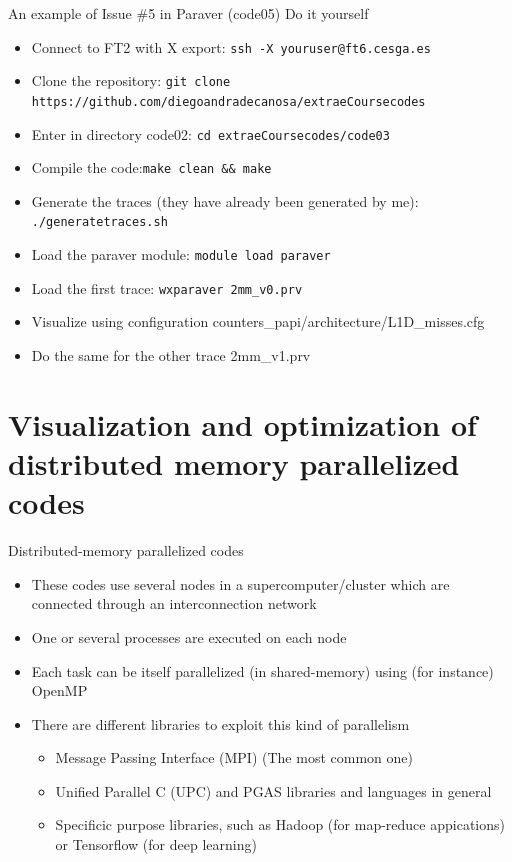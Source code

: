 \documentclass[10pt,xcolor=table]{beamer}
\begin{document}
\begin{frame}{An example of Issue \#5 in Paraver (code05)}
Do it yourself
\begin{itemize}
    \item Connect to FT2 with X export: {\tt ssh -X youruser@ft6.cesga.es}
    \item Clone the repository: {\tt git clone https://github.com/diegoandradecanosa/extraeCoursecodes}
    \item Enter in directory code02: {\tt cd extraeCoursecodes/code03}
        \item Compile the code:{\tt make clean \&\& make}
    \item Generate the traces (they have already been generated by me): {\tt ./generatetraces.sh}
    \item Load the paraver module:  {\tt module load paraver}
    \item Load the first trace: {\tt wxparaver 2mm\_v0.prv}
    \item Visualize using configuration counters\_papi/architecture/L1D\_misses.cfg
    \item Do the same for the other trace 2mm\_v1.prv
\end{itemize}
\end{frame}




\section{Visualization and optimization of distributed memory parallelized codes}


\begin{frame}{Distributed-memory parallelized codes}
\begin{itemize}
    \item These codes use several nodes in a supercomputer/cluster which are connected through an interconnection network
    \item One or several processes are executed on each node
    \item Each task can be itself parallelized (in shared-memory) using (for instance) OpenMP
    \item There are different libraries to exploit this kind of parallelism
        \begin{itemize}
            \item Message Passing Interface (MPI) (The most common one) 
            \item Unified Parallel C (UPC) and PGAS libraries and languages in general
            \item Specificic purpose libraries, such as Hadoop (for map-reduce appications) or Tensorflow (for deep learning) 
        \end{itemize}
\end{itemize}
\end{frame}
\end{document}
